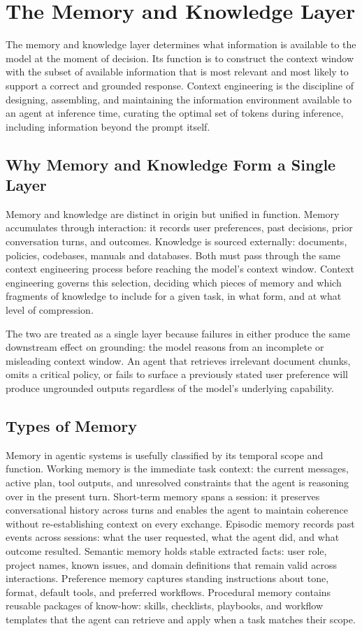 \chapter{The Memory and Knowledge Layer}

The memory and knowledge layer determines what information is available to the model at
the moment of decision. Its function is to construct the context window with the subset
of available information that is most relevant and most likely to support a correct and
grounded response. Context engineering is the discipline of designing, assembling, and
maintaining the information environment available to an agent at inference time, curating
the optimal set of tokens during inference, including information beyond the prompt
itself.

\section{Why Memory and Knowledge Form a Single Layer}

Memory and knowledge are distinct in origin but unified in function. Memory accumulates
through interaction: it records user preferences, past decisions, prior conversation
turns, and outcomes. Knowledge is sourced externally: documents, policies, codebases,
manuals and databases. Both must pass through the same context engineering
process before reaching the model's context window. Context engineering governs this
selection, deciding which pieces of memory and which fragments of knowledge to include
for a given task, in what form, and at what level of compression.

The two are treated as a single layer because failures in either produce the same
downstream effect on grounding: the model reasons from an incomplete or misleading
context window. An agent that retrieves irrelevant document chunks, omits a critical
policy, or fails to surface a previously stated user preference will produce ungrounded
outputs regardless of the model's underlying capability.

\section{Types of Memory}

Memory in agentic systems is usefully classified by its temporal scope and function.
Working memory is the immediate task context: the current messages, active plan, tool
outputs, and unresolved constraints that the agent is reasoning over in the present turn.
Short-term memory spans a session: it preserves conversational history across turns and
enables the agent to maintain coherence without re-establishing context on every exchange.
Episodic memory records past events across sessions: what the user requested, what the
agent did, and what outcome resulted. Semantic memory holds stable extracted facts: user
role, project names, known issues, and domain definitions that remain valid across
interactions. Preference memory captures standing instructions about tone, format, default
tools, and preferred workflows. Procedural memory contains reusable packages of know-how:
skills, checklists, playbooks, and workflow templates that the agent can retrieve and
apply when a task matches their scope.


